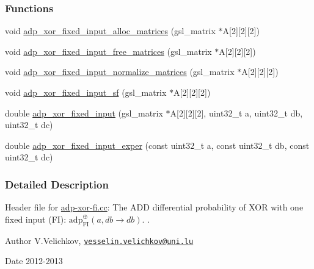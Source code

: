 \subsubsection*{\-Functions}
\begin{DoxyCompactItemize}
\item 
void \hyperlink{adp-xor-fi_8hh_a605b1bc0ca9dd17b1dfc2b818bb1fcc4}{adp\-\_\-xor\-\_\-fixed\-\_\-input\-\_\-alloc\-\_\-matrices} (gsl\-\_\-matrix $\ast$\-A\mbox{[}2\mbox{]}\mbox{[}2\mbox{]}\mbox{[}2\mbox{]})
\item 
void \hyperlink{adp-xor-fi_8hh_acb74304054bfcdeb6ab52fd2aeadc9fe}{adp\-\_\-xor\-\_\-fixed\-\_\-input\-\_\-free\-\_\-matrices} (gsl\-\_\-matrix $\ast$\-A\mbox{[}2\mbox{]}\mbox{[}2\mbox{]}\mbox{[}2\mbox{]})
\item 
void \hyperlink{adp-xor-fi_8hh_a2c0e217c519708b43b9b18866874f252}{adp\-\_\-xor\-\_\-fixed\-\_\-input\-\_\-normalize\-\_\-matrices} (gsl\-\_\-matrix $\ast$\-A\mbox{[}2\mbox{]}\mbox{[}2\mbox{]}\mbox{[}2\mbox{]})
\item 
void \hyperlink{adp-xor-fi_8hh_a37c75fcba5d5904b75461ab35ff8d80d}{adp\-\_\-xor\-\_\-fixed\-\_\-input\-\_\-sf} (gsl\-\_\-matrix $\ast$\-A\mbox{[}2\mbox{]}\mbox{[}2\mbox{]}\mbox{[}2\mbox{]})
\item 
double \hyperlink{adp-xor-fi_8hh_a99d9ef4f2707e61bbd739aa41c93dcb4}{adp\-\_\-xor\-\_\-fixed\-\_\-input} (gsl\-\_\-matrix $\ast$\-A\mbox{[}2\mbox{]}\mbox{[}2\mbox{]}\mbox{[}2\mbox{]}, uint32\-\_\-t a, uint32\-\_\-t db, uint32\-\_\-t dc)
\item 
double \hyperlink{adp-xor-fi_8hh_a3e8bb4c4a614a447a18d727c1adf219a}{adp\-\_\-xor\-\_\-fixed\-\_\-input\-\_\-exper} (const uint32\-\_\-t a, const uint32\-\_\-t db, const uint32\-\_\-t dc)
\end{DoxyCompactItemize}


\subsubsection{\-Detailed \-Description}
\-Header file for \hyperlink{adp-xor-fi_8cc}{adp-\/xor-\/fi.\-cc}\-: \-The \-A\-D\-D differential probability of \-X\-O\-R with one fixed input (\-F\-I)\-: $\mathrm{adp}^{\oplus}_{\mathrm{FI}}(a,db \rightarrow db)$. . \begin{DoxyAuthor}{\-Author}
\-V.\-Velichkov, \href{mailto:vesselin.velichkov@uni.lu}{\tt vesselin.\-velichkov@uni.\-lu} 
\end{DoxyAuthor}
\begin{DoxyDate}{\-Date}
2012-\/2013 
\end{DoxyDate}


